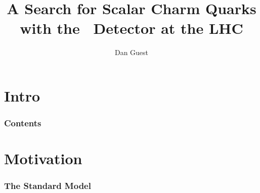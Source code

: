 \documentclass[usenames,dvipsnames]{beamer}
\title[Charmed SUSY]{A Search for Scalar Charm Quarks with the \atlas\ Detector at the LHC}
\author[dhg3]{Dan Guest}
\institute[Yale]{Yale University}
\begin{document}
\section*{Intro}

\maketitle
\begin{frame}
  \frametitle{Contents}
  \tableofcontents
\end{frame}


\section{Motivation}

\begin{frame}
  \frametitle{The Standard Model}
  \begin{center}
  \end{center}
\end{frame}
\end{document}
